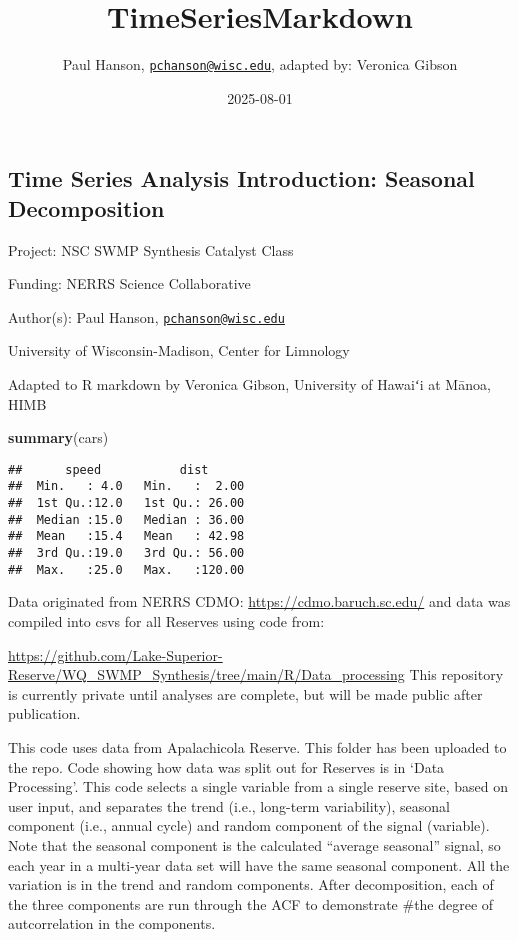 \documentclass[
]{article}
\title{TimeSeriesMarkdown}
\author{Paul Hanson,
\href{mailto:pchanson@wisc.edu}{\nolinkurl{pchanson@wisc.edu}}, adapted
by: Veronica Gibson}
\date{2025-08-01}
\newenvironment{Shaded}{\begin{snugshade}}{\end{snugshade}}
\newcommand{\FunctionTok}[1]{\textcolor[rgb]{0.13,0.29,0.53}{\textbf{#1}}}
\newcommand{\NormalTok}[1]{#1}
\begin{document}
\maketitle

\subsection{Time Series Analysis Introduction: Seasonal
Decomposition}\label{time-series-analysis-introduction-seasonal-decomposition}

Project: NSC SWMP Synthesis Catalyst Class

Funding: NERRS Science Collaborative

Author(s): Paul Hanson,
\href{mailto:pchanson@wisc.edu}{\nolinkurl{pchanson@wisc.edu}}

University of Wisconsin-Madison, Center for Limnology

Adapted to R markdown by Veronica Gibson, University of Hawaiʻi at
Mānoa, HIMB

\begin{Shaded}
\begin{Highlighting}[]
\FunctionTok{summary}\NormalTok{(cars)}
\end{Highlighting}
\end{Shaded}

\begin{verbatim}
##      speed           dist       
##  Min.   : 4.0   Min.   :  2.00  
##  1st Qu.:12.0   1st Qu.: 26.00  
##  Median :15.0   Median : 36.00  
##  Mean   :15.4   Mean   : 42.98  
##  3rd Qu.:19.0   3rd Qu.: 56.00  
##  Max.   :25.0   Max.   :120.00
\end{verbatim}

Data originated from NERRS CDMO: \url{https://cdmo.baruch.sc.edu/} and
data was compiled into csvs for all Reserves using code from:

\url{https://github.com/Lake-Superior-Reserve/WQ_SWMP_Synthesis/tree/main/R/Data_processing}
This repository is currently private until analyses are complete, but
will be made public after publication.

This code uses data from Apalachicola Reserve. This folder has been
uploaded to the repo. Code showing how data was split out for Reserves
is in `Data Processing'. This code selects a single variable from a
single reserve site, based on user input, and separates the trend (i.e.,
long-term variability), seasonal component (i.e., annual cycle) and
random component of the signal (variable). Note that the seasonal
component is the calculated ``average seasonal'' signal, so each year in
a multi-year data set will have the same seasonal component. All the
variation is in the trend and random components. After decomposition,
each of the three components are run through the ACF to demonstrate
\#the degree of autcorrelation in the components.
\end{document}
